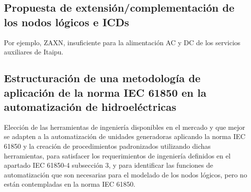 	\subsection{Propuesta de extensi\'on/complementaci\'on de los nodos l\'ogicos
		e ICDs} Por ejemplo, ZAXN, insuficiente para la alimentaci\'on AC y DC de los
		servicios auxiliares de Itaipu.
	\subsection{Estructuraci\'on de una metodolog\'ia de aplicaci\'on de la norma
		IEC 61850 en la automatizaci\'on de hidroel\'ectricas} Elecci\'on de las
		herramientas de ingenier\'ia disponibles en el mercado y que mejor se adapten
		a la automatizaci\'on de unidades generadoras aplicando la norma IEC 61850 y
		la creaci\'on de procedimientos padronizados utilizando dichas herramientas,
		para satisfacer los requerimientos de ingenier\'ia definidos en el apartado
		IEC 61850-4 subsecci\'on 3, y para identificar las funciones de
		automatizaci\'on que son necesarias para el modelado de los nodos l\'ogicos,
		pero no est\'an contempladas en la norma IEC 61850.
